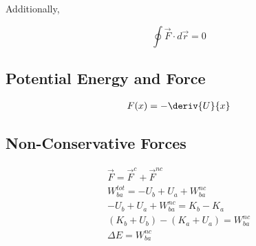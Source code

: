 \documentclass{notes}
\begin{document}
Additionally,

\[\oint \vec{F} \cdot d\vec{r} = 0\]

\subsection{Potential Energy and Force}

\begin{gather}
    F(x) = -\deriv{U}{x}
\end{gather}

\subsection{Non-Conservative Forces}

\begin{gather}
    \vec{F} = \vec{F}^c + \vec{F}^{nc}\\
    W_{ba}^{tot} = -U_b + U_a + W_{ba}^{nc}\\
    -U_b + U_a + W_{ba}^{nc} = K_b - K_a\\
    (K_b + U_b) - (K_a + U_a) = W_{ba}^{nc}\\
    \Delta E = W_{ba}^{nc}
\end{gather}
\end{document}
